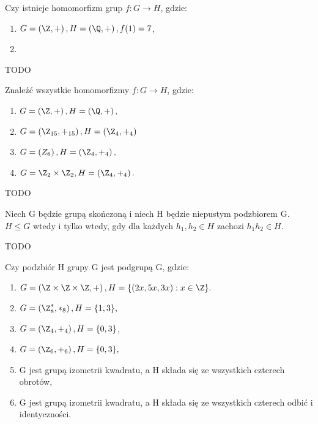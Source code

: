 \begin{problem}[11]

	Czy istnieje homomorfizm grup $f:G\rightarrow H$, gdzie:

	\begin{enumerate}[label=\alph*)]
		\item $G= \left( \Z,+ \right), H=\left( \Q,+ \right),f(1) = 7$,
		\item 
	\end{enumerate}
\end{problem}
\begin{solution}

	TODO	
\end{solution}
\begin{problem}[12]

	Znaleźć wszystkie homomorfizmy $f:G\rightarrow H$, gdzie:

	\begin{enumerate}[label=\alph*)]
		\item $G = \left( \Z, + \right), H = \left( \Q, + \right),$
		\item $G = \left( \Z_{15}, +_{15} \right), H = \left( \Z_{4}, +_{4} \right)$
		\item $G = \left( Z_{6} \right), H= \left( \Z_{4}, +_{4} \right),$ 
		\item $G = \Z_{2}\times \Z_{2}, H= \left( \Z_{4}, +_{4} \right) .$
	\end{enumerate}
\end{problem}
\begin{solution}

	TODO	
\end{solution}
\begin{problem}[13]
	Niech G będzie grupą skończoną i niech H będzie niepustym podzbiorem G. $H\le G$ wtedy i tylko wtedy, gdy dla każdych $h_1,h_2\in H$ zachozi $h_1h_2\in H.$
\end{problem}
\begin{solution}

	TODO
\end{solution}
\begin{problem}[14]

	Czy podzbiór H grupy G jest podgrupą G, gdzie:
	\begin{enumerate}[label=\alph*)]
		\item $G = \left( \Z\times\Z\times\Z, +\right), H=\{\left( 2x,5x,3x \right):x \in \Z\}.$
		\item $G = \left(\Z_{8}^{*}, *_{8}\right), H=\{1,3\},$
		\item $G = \left( \Z_{4}, +_{4} \right), H= \{0,3\} $,
		\item $G = \left( \Z_{6}, +_{6} \right), H= \{0,3\},$
		\item G jest grupą izometrii kwadratu, a H składa się ze wszystkich czterech obrotów,
		\item G jest grupą izometrii kwadratu, a H składa się ze wszystkich czterech odbić i identyczności.
	\end{enumerate}
\end{problem}
